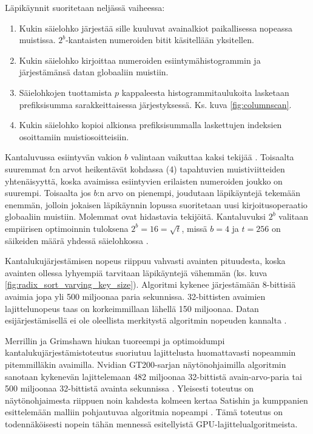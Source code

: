\documentclass[a4paper,11pt]{article}
\begin{document}
Läpikäynnit suoritetaan neljässä vaiheessa:
\begin{singlespace*}
\begin{enumerate}
\item Kukin säielohko järjestää sille kuuluvat avainalkiot paikallisessa nopeassa muistissa. $2^b$-kantaisten numeroiden bitit käsitellään yksitellen.
\item Kukin säielohko kirjoittaa numeroiden esiintymähistogrammin ja järjestämänsä datan globaaliin muistiin.
\item Säielohkojen tuottamista $p$ kappaleesta histogrammitaulukoita lasketaan prefiksisumma sarakkeittaisessa järjestyksessä. Ks. kuva \ref{fig:columnscan}.
\item Kukin säielohko kopioi alkionsa prefiksisummalla laskettujen indeksien osoittamiin muistiosoitteisiin.
\end{enumerate}
\end{singlespace*}

Kantaluvussa esiintyvän vakion $b$ valintaan vaikuttaa kaksi tekijää \cite{satish2009}. Toisaalta suuremmat $b$:n arvot heikentävät kohdassa (4) tapahtuvien muistiviitteiden yhtenäisyyttä, koska avaimissa esiintyvien erilaisten numeroiden joukko on suurempi. Toisaalta jos $b$:n arvo on pienempi, joudutaan läpikäyntejä tekemään enemmän, jolloin jokaisen läpikäynnin lopussa suoritetaan uusi kirjoitusoperaatio globaaliin muistiin. Molemmat ovat hidastavia tekijöitä. Kantaluvuksi $2^b$ valitaan empiirisen optimoinnin tuloksena $2^b = 16 = \sqrt{t}$, missä $b = 4$ ja $t = 256$ on säikeiden määrä yhdessä säielohkossa \cite{satish2009}.

Kantalukujärjestämisen nopeus riippuu vahvasti avainten pituudesta, koska avainten ollessa lyhyempiä tarvitaan läpikäyntejä vähemmän (ks. kuva \ref{fig:radix_sort_varying_key_size}). Algoritmi kykenee järjestämään 8-bittisiä avaimia jopa yli 500 miljoonaa paria sekunnissa. 32-bittisten avaimien lajittelunopeus taas on korkeimmillaan lähellä 150 miljoonaa. Datan esijärjestämisellä ei ole oleellista merkitystä algoritmin nopeuden kannalta \cite{satish2009}.

Merrillin ja Grimshawn \cite{merrill2011} hiukan tuoreempi ja optimoidumpi kantalukujärjestämistoteutus suoriutuu lajittelusta huomattavasti nopeammin pitemmilläkin avaimilla. Nvidian GT200-sarjan näytönohjaimilla algoritmin sanotaan kykenevän lajittelemaan 482 miljoonaa 32-bittistä avain-arvo-paria tai 500 miljoonaa 32-bittistä avainta sekunnissa \cite{merrill2010}. Yleisesti toteutus on näytönohjaimesta riippuen noin kahdesta kolmeen kertaa Satishin ja kumppanien esittelemään malliin pohjautuvaa algoritmia nopeampi \cite{merrill2011}. Tämä toteutus on todennäköisesti nopein tähän mennessä esitellyistä GPU-lajittelualgoritmeista.
\end{document}
